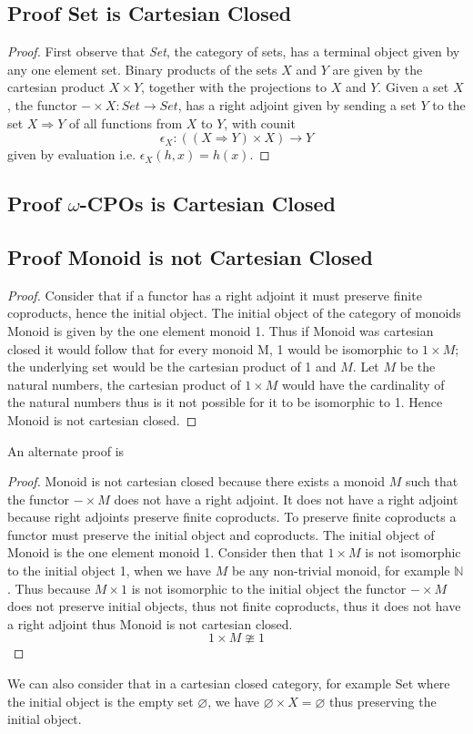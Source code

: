\documentclass{article}
\theoremstyle{definition}
\newcommand{\N}{\mathbb{N}}
\begin{document}
\subsection{Proof Set is Cartesian Closed}
\begin{proof}
    First observe that \textit{Set}, the category of sets,
    has a terminal object given by any one element set.
    Binary products of the sets $X$ and $Y$ are given by the
    cartesian product $X \times Y$,
    together with the projections to $X$ and $Y$.
    Given a set $X$, the functor $- \times X : Set \rightarrow Set$,
    has a right adjoint given by
    sending a set $Y$ to the set $X \Rightarrow Y$ of all functions from $X$ to $Y$,
    with counit
    $$\epsilon_X : ((X \Rightarrow Y) \times X) \rightarrow Y$$
    given by evaluation i.e. $\epsilon_X(h,x) = h(x)$.
\end{proof}

\subsection{Proof $\omega$-CPOs is Cartesian Closed}

\subsection{Proof Monoid is not Cartesian Closed}
\begin{proof}
    Consider that if a functor has a right adjoint it must preserve finite coproducts,
    hence the initial object.
    The initial object of the category of monoids Monoid is given by the one element monoid 1.
    Thus if Monoid was cartesian closed it would follow that for every monoid M,
    1 would be isomorphic to $1 \times M$;
    the underlying set would be the cartesian product of 1 and $M$.
    Let $M$ be the natural numbers,
    the cartesian product of $1 \times M$ would have the cardinality of the natural numbers
    thus is it not possible for it to be isomorphic to 1.
    Hence Monoid is not cartesian closed.
\end{proof}
An alternate proof is
\begin{proof}
    Monoid is not cartesian closed because there exists a monoid $M$ such that
    the functor $- \times M$ does not have a right adjoint.
    It does not have a right adjoint because right adjoints preserve finite coproducts.
    To preserve finite coproducts a functor must preserve the initial object and coproducts.
    The initial object of Monoid is the one element monoid 1.
    Consider then that $1 \times M$ is not isomorphic to the initial object 1,
    when we have $M$ be any non-trivial monoid, for example $\N$.
    Thus because $M \times 1$ is not isomorphic to the initial object
    the functor $- \times M$ does not preserve initial objects,
    thus not finite coproducts,
    thus it does not have a right adjoint
    thus Monoid is not cartesian closed.
    $$1 \times M \ncong 1$$
\end{proof}
We can also consider that in a cartesian closed category,
for example Set where the initial object is the empty set $\varnothing$,
we have $\varnothing \times X = \varnothing$ thus preserving the initial object.
\end{document}
